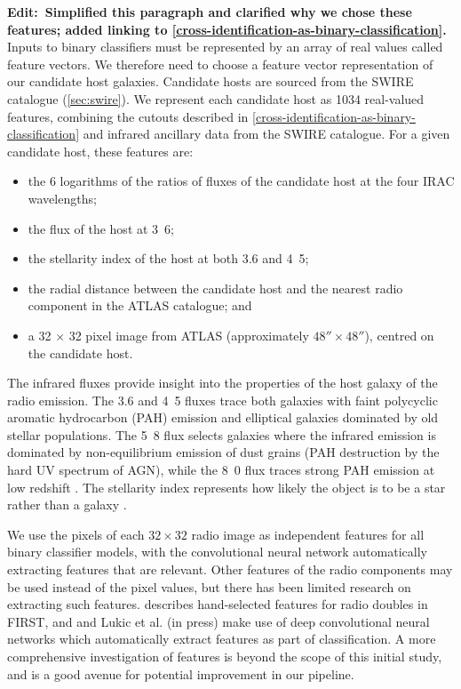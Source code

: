 \documentclass[fleqn,usenatbib,usedcolumn]{mnras}
\newcommand{\edit}[1]{{\bf Edit:~{#1}}}
\begin{document}
    \edit{Simplified this paragraph and clarified why we chose these features; added linking to \autoref{cross-identification-as-binary-classification}.} Inputs to binary classifiers must be represented by an array of real values called feature vectors. We therefore need to choose a feature vector representation of our candidate host galaxies. Candidate hosts are sourced from the SWIRE catalogue (\autoref{sec:swire}). We represent each candidate host as 1034 real-valued features, combining the cutouts described in \autoref{cross-identification-as-binary-classification} and infrared ancillary data from the SWIRE catalogue. For a given candidate host, these features are:
    \begin{itemize}
      \item the 6 logarithms of the ratios of fluxes of the candidate
        host at the four IRAC wavelengths;
      \item the flux of the host at \unit{3.6}{\micro\meter};
      \item the stellarity index of the host at both 3.6 and
        \unit{4.5}{\micro\meter};
      \item the radial distance between the candidate host and the nearest
        radio component in the ATLAS catalogue; and
      \item a 32 $\times$ 32 pixel image from ATLAS (approximately $48''
        \times 48''$), centred on the candidate host.
    \end{itemize}

    The infrared fluxes provide insight into the properties of the host galaxy of the radio emission. The 3.6 and \unit{4.5}{\micro\meter} fluxes trace both galaxies with faint polycyclic aromatic hydrocarbon (PAH) emission and elliptical galaxies dominated by old stellar populations. The \unit{5.8}{\micro\meter} flux selects galaxies where the infrared emission is dominated by non-equilibrium emission of dust grains (PAH destruction
    by the hard UV spectrum of AGN), while the \unit{8.0}{\micro\meter} flux traces strong PAH emission at low redshift \citep{Sajina2005}. The stellarity index represents how likely the object is to be a star rather than a galaxy \citep{surace05swire}.

    We use the pixels of each $32 \times 32$ radio image as independent features for all binary classifier models, with the convolutional neural network automatically extracting features that are relevant. Other features of the radio components may be used instead of the pixel values, but there has been limited research on extracting such features. \citet{proctor06} describes hand-selected features for radio doubles in FIRST, and \citet{aniyan17cnn} and Lukic et al. (in press) make use of deep convolutional neural networks which automatically extract features as part of classification. A more comprehensive investigation of features is beyond the scope of this initial study, and is a good avenue for potential improvement in our pipeline.
\end{document}
